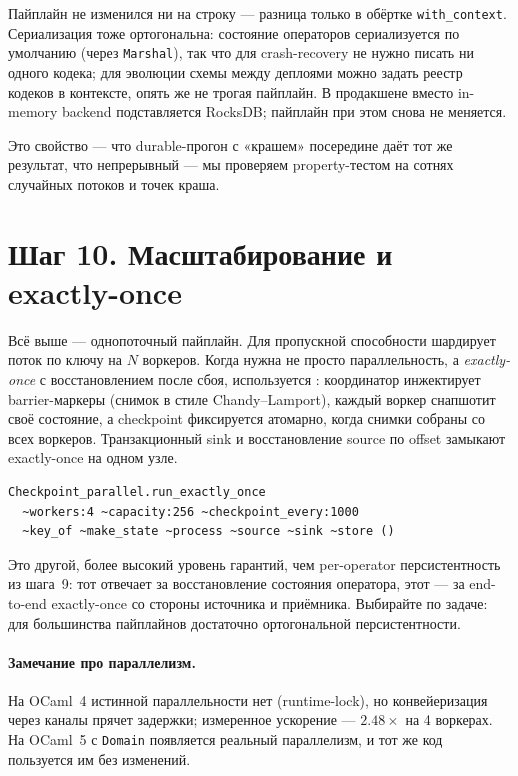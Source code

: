 \documentclass[11pt,a4paper]{article}
\begin{document}
Пайплайн не изменился ни на строку --- разница только в обёртке
\texttt{with\_context}. Сериализация тоже ортогональна: состояние
операторов сериализуется по умолчанию (через \texttt{Marshal}), так что
для crash-recovery не нужно писать ни одного кодека; для эволюции
схемы между деплоями можно задать реестр кодеков в контексте, опять же
не трогая пайплайн. В продакшене вместо in-memory backend подставляется
RocksDB; пайплайн при этом снова не меняется.

Это свойство --- что durable-прогон с «крашем» посередине даёт тот же
результат, что непрерывный --- мы проверяем property-тестом на сотнях
случайных потоков и точек краша.

\section{Шаг 10. Масштабирование и exactly-once}

Всё выше --- однопоточный пайплайн. Для пропускной способности
 шардирует поток по ключу на $N$
воркеров. Когда нужна не просто параллельность, а \emph{exactly-once}
с восстановлением после сбоя, используется
: координатор
инжектирует barrier-маркеры (снимок в стиле Chandy--Lamport), каждый
воркер снапшотит своё состояние, а checkpoint фиксируется атомарно,
когда снимки собраны со всех воркеров. Транзакционный sink и
восстановление source по offset замыкают exactly-once на одном узле.

\begin{lstlisting}
Checkpoint_parallel.run_exactly_once
  ~workers:4 ~capacity:256 ~checkpoint_every:1000
  ~key_of ~make_state ~process ~source ~sink ~store ()
\end{lstlisting}

Это другой, более высокий уровень гарантий, чем per-operator
персистентность из шага~9: тот отвечает за восстановление состояния
оператора, этот --- за end-to-end exactly-once со стороны источника и
приёмника. Выбирайте по задаче: для большинства пайплайнов достаточно
ортогональной персистентности.

\paragraph{Замечание про параллелизм.} На OCaml~4 истинной
параллельности нет (runtime-lock), но конвейеризация через каналы
прячет задержки; измеренное ускорение --- $2.48\times$ на 4 воркерах.
На OCaml~5 с \texttt{Domain} появляется реальный параллелизм, и тот же
код пользуется им без изменений.
\end{document}

